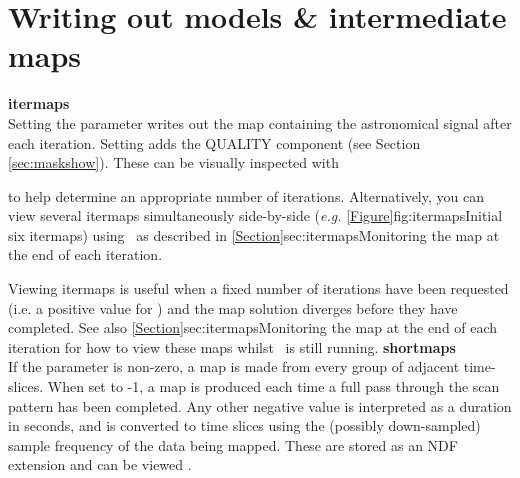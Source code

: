 \section{Writing out models \& intermediate maps}
\label{sec:inter}

\textbf{itermaps}\\
Setting the parameter  writes out the
map containing the astronomical signal after each iteration. Setting
 adds the QUALITY component 
(see Section \ref{sec:maskshow}).  These can be visually inspected with

\begin{terminalv}
\end{terminalv}

to help determine an appropriate number of iterations. Alternatively, you
can view several itermaps simultaneously side-by-side (\emph{e.g.}
\cref{Figure}{fig:itermaps}{Initial six itermaps}) using \Kappa\ as
described in \cref{Section}{sec:itermaps}{Monitoring the map at the
end of each iteration}.

Viewing itermaps is useful when a fixed number of iterations have been requested (i.e. a positive
value for ) and the map solution diverges before
they have completed. See also \cref{Section}{sec:itermaps}{Monitoring the map
at the end of each iteration} for how to view these maps whilst \makemap\ is still running.
\newline\newline
\textbf{shortmaps}\\
If the parameter  is non-zero, a map is made from
every group of adjacent time-slices. When set to -1, a map is produced 
each time a full pass through the scan pattern has been completed. Any 
other negative value is interpreted as a duration in seconds, and is converted 
to time slices using the (possibly down-sampled) sample frequency of the 
data being mapped. These are stored as an NDF extension and can be viewed \gaia.

